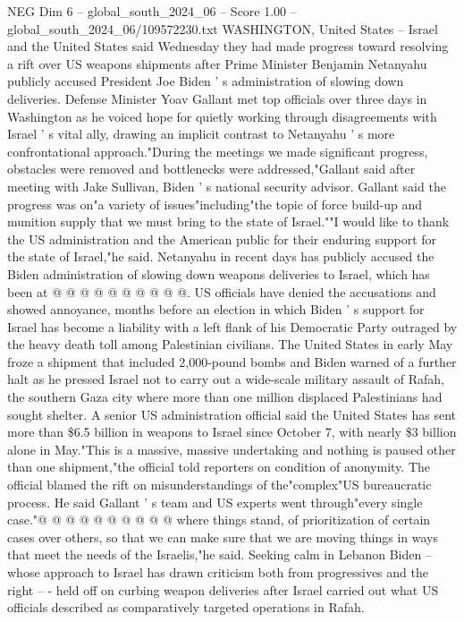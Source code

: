 \begin{textsample}{NEG Dim 6 – global\_south\_2024\_06 – Score 1.00 – global\_south\_2024\_06/109572230.txt}  \label{ex:f6_neg_275}
WASHINGTON, United States -- Israel and the United States said Wednesday they had made progress toward resolving a rift over US weapons shipments after Prime Minister Benjamin Netanyahu publicly accused President Joe Biden ' s administration of slowing down deliveries.
Defense Minister Yoav Gallant met top officials over three days in Washington as he voiced hope for quietly working through disagreements with Israel ' s vital ally, drawing an implicit contrast to Netanyahu ' s more confrontational approach."During the meetings we made significant progress, obstacles were removed and bottlenecks were addressed,"Gallant said after meeting with Jake Sullivan, Biden ' s national security advisor.
Gallant said the progress was on"a variety of issues"including"the topic of force build-up and munition supply that we must bring to the state of Israel.""I would like to thank the US administration and the American public for their enduring support for the state of Israel,"he said.
Netanyahu in recent days has publicly accused the Biden administration of slowing down weapons deliveries to Israel, which has been at @ @ @ @ @ @ @ @ @ @.
US officials have denied the accusations and showed annoyance, months before an election in which Biden ' s support for Israel has become a liability with a left flank of his Democratic Party outraged by the heavy death toll among Palestinian civilians.
The United States in early May froze a shipment that included 2,000-pound bombs and Biden warned of a further halt as he pressed Israel not to carry out a wide-scale military assault of Rafah, the southern Gaza city where more than one million displaced Palestinians had sought shelter.
A senior US administration official said the United States has sent more than \$6.5 billion in weapons to Israel since October 7, with nearly \$3 billion alone in May."This is a massive, massive undertaking and nothing is paused other than one shipment,"the official told reporters on condition of anonymity.
The official blamed the rift on misunderstandings of the"complex"US bureaucratic process.
He said Gallant ' s team and US experts went through"every single case."@ @ @ @ @ @ @ @ @ @ where things stand, of prioritization of certain cases over others, so that we can make sure that we are moving things in ways that meet the needs of the Israelis,"he said.
Seeking calm in Lebanon Biden -- whose approach to Israel has drawn criticism both from progressives and the right -- - held off on curbing weapon deliveries after Israel carried out what US officials described as comparatively targeted operations in Rafah.

\end{textsample}

